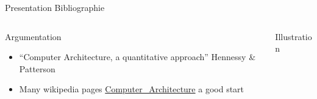 %
\begin{Frame}{Presentation Bibliographie}
  \begin{columns}[t]
    \begin{column}{5cm} %
      \begin{block}{Argumentation}
        \begin{itemize}
        \item ``Computer Architecture, a quantitative approach''
          Hennessy \& Patterson
        \item Many wikipedia pages
          \href{https://en.wikipedia.org/wiki/Computer_architecture}{Computer\_Architecture}
          a good start
        \end{itemize}
      \end{block} 
    \end{column}
    
    \begin{column}{5cm} %
      \begin{block}{Illustration}
      \end{block}   
    \end{column}
  \end{columns}  
\end{Frame}



